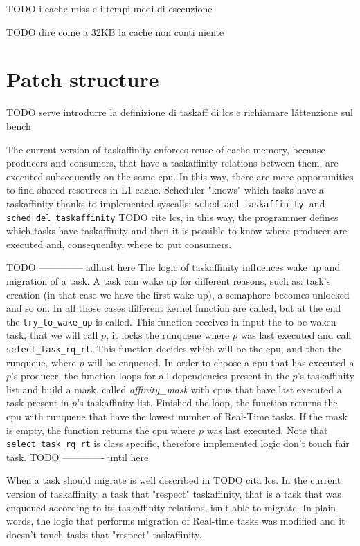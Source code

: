 TODO i cache miss e i tempi medi di esecuzione

TODO dire come a 32KB la cache non conti niente

\section{Patch structure}

TODO serve introdurre la definizione di taskaff di lcs e richiamare l\'attenzione sul bench

The current version of taskaffinity enforces reuse of cache memory, because producers and consumers, that have a taskaffinity relations between them, are 
executed subsequently on the same cpu. In this way, there are more opportunities to find shared resources in L1 cache. Scheduler "knows" which tasks have a 
taskaffinity thanks to implemented syscalls: \texttt{sched\_add\_taskaffinity}, and \texttt{sched\_del\_taskaffinity} TODO cite lcs, in this way, the 
programmer defines which tasks have taskaffinity and then it is possible to know where producer are executed and, consequenlty, where to put consumers.

TODO -------------- adhust here
The logic of taskaffinity influences wake up and migration of a task. A task can wake up for different reasons, such as: task's creation (in that case 
we have the first wake up), a semaphore becomes unlocked and so on. In all those cases different kernel function are called, but at the end the 
\texttt{try\_to\_wake\_up} is called. This function receives in input the to be waken task, that we will call $p$, it locks the runqueue where $p$ was last 
executed and call \texttt{select\_task\_rq\_rt}. This function decides which will be the cpu, and then the runqueue, where $p$ will be enqueued. In order 
to choose a cpu that has executed a $p$'s producer, the function loops for all dependencies present in the $p$'s taskaffinity list and build a mask, 
called \textit{affinity\_mask} with cpus that have last executed a task present in $p$'s taskaffinity list. Finished the loop, the function returns the cpu 
with runqueue that have the lowest number of Real-Time tasks. If the mask is empty, the function returns the cpu where $p$ was last executed. Note that 
\texttt{select\_task\_rq\_rt} is class specific, therefore implemented logic don't touch fair task.
TODO ------------- until here

When a task should migrate is well described in TODO cita lcs. In the current version of taskaffinity, a task that "respect" taskaffinity, that is a task 
that was enqueued according to its taskaffinity relations, isn't able to migrate. In plain words, the logic that performs migration of 
Real-time tasks was modified and it doesn't touch tasks that "respect" taskaffinity.

